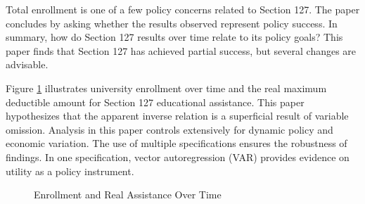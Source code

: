 \documentclass[review]{elsarticle}
\begin{document}
Total enrollment is one of a few policy concerns related to Section 127.
The paper concludes by asking whether the results observed represent policy success.
In summary, how do Section 127 results over time relate to its policy goals?
This paper finds that Section 127 has achieved partial success,
but several changes are advisable.

Figure \ref{fig:intro_enroll_assistance} illustrates university enrollment over time
and the real maximum deductible amount for Section 127 educational assistance.
This paper hypothesizes that the apparent inverse relation is a superficial result of variable omission.
Analysis in this paper controls extensively for dynamic policy and economic variation.
The use of multiple specifications ensures the robustness of findings.
In one specification, vector autoregression (VAR) provides evidence on utility as a policy instrument.

\begin{figure}[h!]
    \centering
    \caption{Enrollment and Real Assistance Over Time}
    \label{fig:intro_enroll_assistance}
\end{figure}
\end{document}
